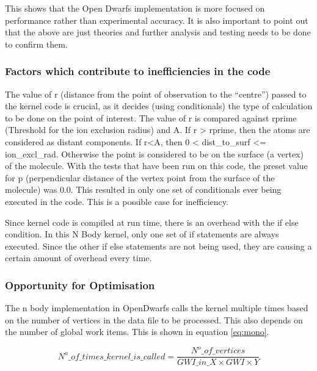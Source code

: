 \par{This shows that the Open Dwarfs implementation is 
    more focused on performance rather than experimental accuracy. 
    It is also important to point out that the above are just theories 
    and further analysis and testing needs to be done to confirm them.}

\subsubsection{Factors which contribute to inefficiencies in the code}
\par{The value of r (distance from the point of observation to the ``centre'') 
    passed to the kernel code is crucial, as it decides (using conditionals) 
    the type of calculation to be done on the point of interest. 
    The value of r is compared against rprime (Threshold for the 
    ion exclusion radius) and A. If r > rprime, then the atoms are 
    considered as distant components. If r<A, then 0 < dist\_to\_surf <= ion\_excl\_rad. 
    Otherwise the point is considered to be on the surface (a vertex) of the 
    molecule. With the tests that have been run on this code, the preset value 
    for p (perpendicular distance of the vertex point from the surface of 
    the molecule) was 0.0. This resulted in only one set of conditionals 
    ever being executed in the code. This is a possible case for 
    inefficiency.}

\par{Since kernel code is compiled at run time, there is an overhead
    with the if else condition. In this N Body kernel, only one set of 
    if statements are always executed. Since the other if else statements 
    are not being used, they are causing a certain amount of overhead 
    every time.}

\subsubsection{Opportunity for Optimisation}
\par{The n body implementation in OpenDwarfs calls the kernel multiple 
    times based on the number of vertices in the data file to be processed. 
    This also depends on the number of global work items. This is shown in 
    equation \ref{eq:mono}.}

\begin{equation}\label{eq:mono}
    N^o\_of\_times\_kernel\_is\_called = \frac{N^o\_of\_vertices}{{GWI\_in\_X}\times{GWI}\times{Y}}
\end{equation}

